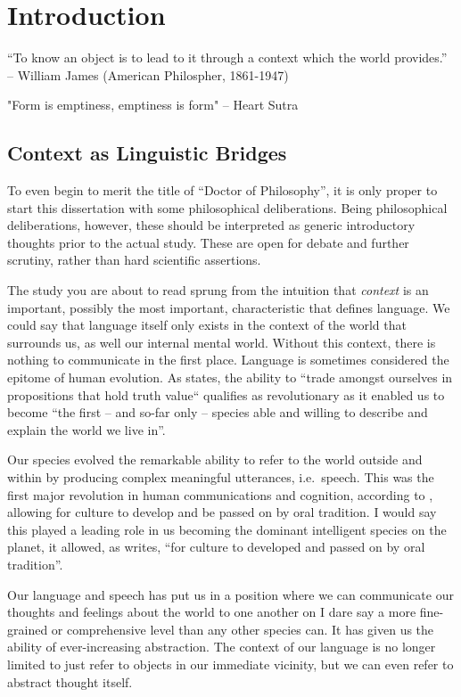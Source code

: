 \chapter{Introduction}
\label{chap:intro}

“To know an object is to lead to it through a context which the world provides.” -- William James (American Philospher, 1861-1947)

"Form is emptiness, emptiness is form" -- Heart Sutra

\section{Context as Linguistic Bridges}


To even begin to merit the title of ``Doctor of Philosophy'', it is only proper to start this dissertation with some
philosophical deliberations. Being philosophical deliberations, however, these should be interpreted as generic
introductory thoughts prior to the actual study. These are open for debate and further scrutiny, rather than hard
scientific assertions.

The study you are about to read sprung from the intuition that \emph{context}
is an important, possibly the most important, characteristic that defines
language. We could say that language itself only exists in the context of the world that
surrounds us, as well our internal mental world. Without this context, there is
nothing to communicate in the first place. Language is sometimes considered the
epitome of human evolution. As \cite{HARNAD91} states, the ability to ``trade amongst ourselves in propositions that hold truth value`` qualifies as revolutionary as it enabled us to become ``the first -- and so-far only -- species able and willing to describe and
explain the world we live in''.

Our species evolved the remarkable ability to refer to the world outside and within by producing complex meaningful
utterances, i.e.\ speech.  This was the first major revolution in human communications and cognition, according to
\cite{HARNAD91}, allowing for culture to develop and be passed on by oral tradition. I would say this played a leading
role in us becoming the dominant intelligent species on the planet, it allowed, as \cite{HARNAD91} writes, ``for culture
to developed and passed on by oral tradition''.

Our language and speech has put us in a position where we can communicate our thoughts and feelings about the world
to one another on I dare say a more fine-grained or comprehensive level than any other species can. It has given us the
ability of ever-increasing abstraction. The context of our language is no longer limited to just refer to objects in our
immediate vicinity, but we can even refer to abstract thought itself.

